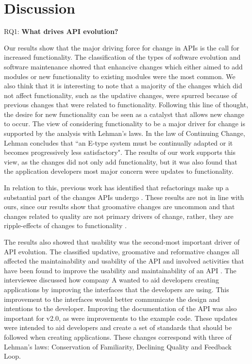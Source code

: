 \documentclass{sig-alternate}
\begin{document}
\section{Discussion} \label{discussion}

\noindent
RQ1: \textbf{What drives API evolution?}
\smallskip

Our results show that the major driving force for change in APIs is the call for increased functionality. The classification of the types of software evolution and software maintenance showed that enhancive changes which either aimed to add modules or new functionality to existing modules were the most common. We also think that it is interesting to note that a majority of the changes which did not affect functionality, such as the updative changes, were spurred because of previous changes that were related to functionality. Following this line of thought, the desire for new functionality can be seen as a catalyst that allows new change to occur. The view of considering functionality to be a major driver for change is supported by the analysis with Lehman's laws. In the law of Continuing Change, Lehman concludes that ``an E-type system must be continually adapted or it becomes progressively less satisfactory". The results of our work supports this view, as the changes did not only add functionality, but it was also found that the application developers most major concern were updates to functionality. 

In relation to this, previous work has identified that refactorings make up a substantial part of the changes APIs undergo \cite{dig2005role, dig2006apis, henkel2005catchup, xing2006refactoring}. These results are not in line with ours, since our results show that groomative changes are uncommon and that changes related to quality are not primary drivers of change, rather, they are ripple-effects of changes to functionality \cite{robbes2012developers}.

The results also showed that usability was the second-most important driver of API evolution. The classified updative, groomative and reformative changes all affected the maintainability and usability of the API and involved activities that have been found to improve the usability and maintainability of an API \cite{afonso2012evaluating, clarke2004measuring, piccioni2013empirical, shi2011empirical}. The interviewee discussed how company A wanted to aid developers creating applications by improving the interfaces that the developers are using. This improvement to the interfaces would better communicate the design and intentions to the developer. Improving the documentation of the API was also important for v2.0, as were improvements to the example code. These updates were intended to aid developers and create a set of standards that should be followed when creating applications. These changes correspond with three of Lehman's laws: Conservation of Familiarity, Declining Quality and Feedback Loop.  
\end{document}
